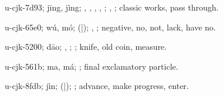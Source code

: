 \begin{multicols}{2}
{\cjkgGlue{}u-cjk-7d93; jīng, jìng; \cjkgGlue{}\cjkgGlue{}\cjkgGlue{}, \cjkgGlue{}\cjkgGlue{}\cjkgGlue{}, \cjkgGlue{}, \cjkgGlue{}\cjkgGlue{}\cjkgGlue{}, \cjkgGlue{}; \cjkgGlue{}, \cjkgGlue{}; classic works, pass through.

\cjkgGlue{}u-cjk-65e0; wú, mó; \cjkgGlue{}\cjkgGlue{}(\cjkgGlue{}|\cjkgGlue{}); \cjkgGlue{}, \cjkgGlue{}; negative, no, not, lack, have no.

\cjkgGlue{}u-cjk-5200; dāo; \cjkgGlue{}, \cjkgGlue{}; \cjkgGlue{}; knife, old coin, measure.

\cjkgGlue{}u-cjk-561b; ma, má; \cjkgGlue{}; final exclamatory particle.

\cjkgGlue{}u-cjk-8fdb; jìn; \cjkgGlue{}\cjkgGlue{}(\cjkgGlue{}|\cjkgGlue{}); \cjkgGlue{}; advance, make progress, enter.

}
\end{multicols}
